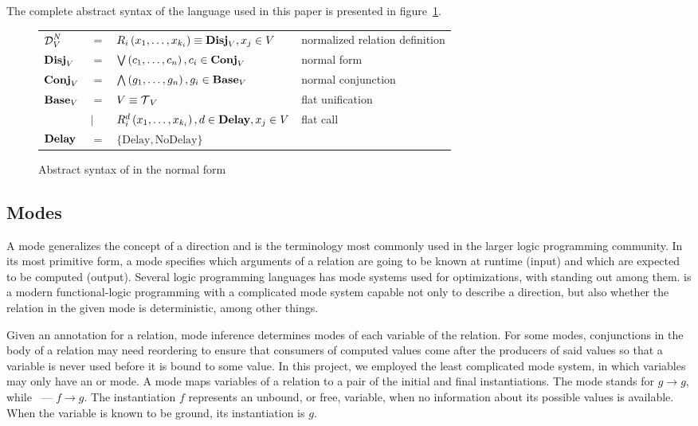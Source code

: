 The complete abstract syntax of the \mk language used in this paper is presented in figure~\ref{fig:miniKanren}.

\begin{figure}[h]
    \begin{tabular}{llll}
     $\operatorname{\mathcal{D}}_{V}^N$ & $=$ & $R_{i}\left( x_1, \ldots, x_{k_{i}} \right) \equiv \operatorname{\mathbf{Disj}}_{V}, x_{j}\in V$ & normalized relation definition \\
    $\operatorname{\mathbf{Disj}}_{V}$ & $=$ & $\bigvee\left( c_1, \ldots, c_{n} \right), c_{i}\in \operatorname{\mathbf{Conj}}_{V}$ & normal form \\
    $\operatorname{\mathbf{Conj}}_{V}$ & $=$ & $\bigwedge\left( g_1, \ldots, g_n \right), g_{i}\in \operatorname{\mathbf{Base}}_{V}$ & normal conjunction \\
    $\operatorname{\mathbf{Base}}_{V}$ & $=$ & $V \equiv \operatorname{\mathcal{T}}_{V}$ & flat unification \\
                & $\mid$ & $R_{i}^{d}\left( x_1, \ldots, x_{k_{i}} \right), d\in \operatorname{\mathbf{Delay}}, x_{j}\in V$ & flat call\\

    $\operatorname{\mathbf{Delay}}$ & $=$ &  $\{\text{Delay}, \text{NoDelay}\} $ &
    \end{tabular}
    \caption{Abstract syntax of \mk in the normal form}
    \label{fig:miniKanren}
\end{figure}

\subsection{Modes}

A mode generalizes the concept of a direction and is the terminology most commonly used in the larger logic programming community.
In its most primitive form, a mode specifies which arguments of a relation are going to be known at runtime (input) and which are expected to be computed (output).
Several logic programming languages has mode systems used for optimizations, with \merc standing out among them.
\merc is a modern functional-logic programming with a complicated mode system capable not only to describe a direction, but also whether the relation in the given mode is deterministic, among other things.

Given an annotation for a relation, mode inference determines modes of each variable of the relation.
For some modes, conjunctions in the body of a relation may need reordering to ensure that consumers of computed values come after the producers of said values so that a variable is never used before it is bound to some value.
In this project, we employed the least complicated mode system, in which variables may only have an \inm or \outm mode.
A mode maps variables of a relation to a pair of the initial and final instantiations.
The mode \inm stands for $g \rightarrow g$, while \outm~--- $f \rightarrow g$.
The instantiation $f$ represents an unbound, or free, variable, when no information about its possible values is available.
When the variable is known to be ground, its instantiation is $g$.

